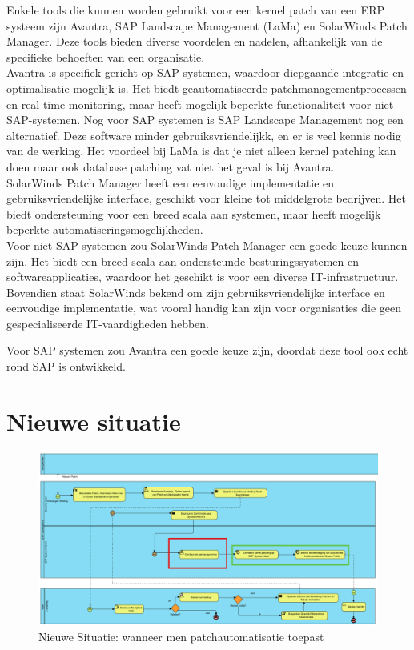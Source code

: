 Enkele tools die kunnen worden gebruikt voor een kernel patch van een ERP systeem zijn Avantra, SAP Landscape Management (LaMa) en SolarWinds Patch Manager. Deze tools bieden diverse voordelen en nadelen, afhankelijk van de specifieke behoeften van een organisatie. \\
 Avantra is specifiek gericht op SAP-systemen, waardoor diepgaande integratie en optimalisatie mogelijk is. Het biedt geautomatiseerde patchmanagementprocessen en real-time monitoring, maar heeft 
 mogelijk beperkte functionaliteit voor niet-SAP-systemen. Nog voor SAP systemen is SAP Landscape Management nog een alternatief. Deze software minder gebruiksvriendelijkk, en er is veel kennis nodig van de werking. Het voordeel 
 bij LaMa is dat je niet alleen kernel patching kan doen maar ook database patching vat niet het geval is bij Avantra. \\
 SolarWinds Patch Manager heeft een eenvoudige implementatie en gebruiksvriendelijke interface, geschikt voor kleine tot middelgrote bedrijven. Het biedt ondersteuning voor een breed scala aan 
 systemen, maar heeft mogelijk beperkte automatiseringsmogelijkheden. \\


 Voor niet-SAP-systemen zou SolarWinds Patch Manager een goede keuze kunnen zijn. Het biedt een breed scala aan ondersteunde besturingssystemen en softwareapplicaties, waardoor het geschikt is voor
  een diverse IT-infrastructuur. Bovendien staat SolarWinds bekend om zijn gebruiksvriendelijke interface en eenvoudige implementatie, wat vooral handig kan zijn voor organisaties die geen gespecialiseerde IT-vaardigheden hebben.
 
Voor SAP systemen zou Avantra een goede keuze zijn, doordat deze tool ook echt rond SAP is ontwikkeld. \\

\section{Nieuwe situatie}
\begin{figure}[h]
    \centering
    \includegraphics[width=\textwidth]{nieuwesituatie.png}
    \caption{Nieuwe Situatie: wanneer men patchautomatisatie toepast}
     \label{fig:nieuwesituatie}
\end{figure}
\newpage

